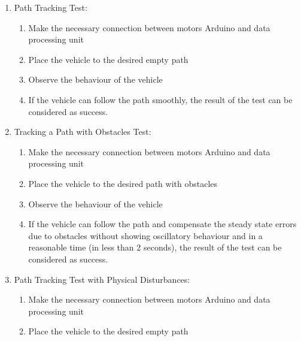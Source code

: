 \documentclass[a4paper,12pt]{article}
\begin{document}
\begin{enumerate}
\item Path Tracking Test: \label{test:d}	

\begin{enumerate}

\item Make the necessary connection between motors Arduino and data processing unit  

\item Place the vehicle to the desired empty path   

\item Observe the behaviour of the vehicle  

\item If the vehicle can follow the path smoothly, the result of the test can be considered as success.  

\end{enumerate}



\item Tracking a Path with Obstacles Test:	\label{test:e}	

\begin{enumerate}

\item Make the necessary connection between motors Arduino and data processing unit  

\item Place the vehicle to the desired path with obstacles  

\item Observe the behaviour of the vehicle  

\item If the vehicle can follow the path and compensate the steady state errors due to obstacles without showing oscillatory behaviour and in a reasonable time (in less than 2 seconds), the result of the test can be considered as success.  

\end{enumerate}



\item Path Tracking Test with Physical Disturbances: \label{test:f}	

\begin{enumerate}

\item Make the necessary connection between motors Arduino and data processing unit  

\item Place the vehicle to the desired empty path   


\end{enumerate}
\end{enumerate}
\end{document}
